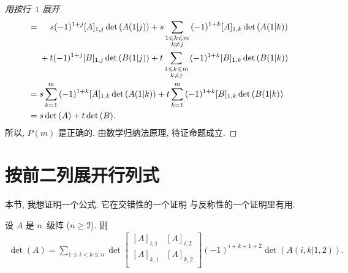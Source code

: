 \begin{proof}[用按行~\(1\) 展开]
\begin{align*}
        = {} &
        \hphantom{{} + {}}
        s (-1)^{1 + j} [A]_{1,j} \det {(A(1|j))}
        + s \sum_{\substack{1 \leq k \leq m \\k \neq j}}
        {(-1)^{1 + k} [A]_{1,k} \det {(A(1|k))}}
        \\
             &
        + t (-1)^{1 + j} [B]_{1,j} \det {(B(1|j))}
        + t \sum_{\substack{1 \leq k \leq m \\k \neq j}}
        {(-1)^{1 + k} [B]_{1,k} \det {(B(1|k))}}
        \\
        = {} &
        s \sum_{k = 1}^{m}
        {(-1)^{1 + k} [A]_{1,k} \det {(A(1|k))}}
        + t \sum_{k = 1}^{m}
        {(-1)^{1 + k} [B]_{1,k} \det {(B(1|k))}}
        \\
        = {} & s \det {(A)} + t \det {(B)}.
    \end{align*}
    所以, \(P(m)\) 是正确的.
    由数学归纳法原理, 待证命题成立.
\end{proof}

\section{按前二列展开行列式}

本节, 我想证明一个公式.
它在交错性的一个证明%
与反称性的一个证明里有用.

\begin{theorem}
    设 \(A\) 是 \(n\)~级阵 (\(n \geq 2\)).
    则
    \begin{align*}
        \det {(A)}
        = \sum_{1 \leq i < k \leq n}
        {\det {
                \begin{bmatrix}
                    [A]_{i,1} & [A]_{i,2} \\
                    [A]_{k,1} & [A]_{k,2} \\
                \end{bmatrix}
            }
            (-1)^{i+k+1+2}
            \det {(A(i,k|1,2))}}.
    \end{align*}
\end{theorem}

